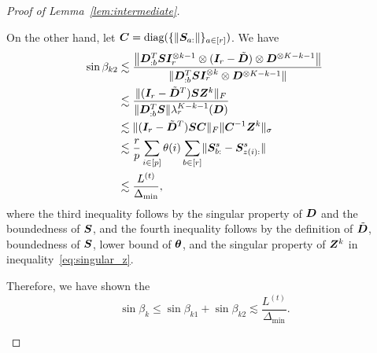 \documentclass[lettersize,journal]{IEEEtran}
\theoremstyle{definition}
\theoremstyle{definition}
\def\fixme#1#2{\textbf{\color{red}[FIXME (#1): #2]}}
\begin{document}
\begin{proof}[Proof of Lemma~\ref{lem:intermediate}]
\begin{enumerate}
    On the other hand, let $\bm C = \text{diag}(\{\lVert\bm S_{a:}\rVert\}_{a \in [r]})$. We have 
    \begin{align}
        \sin \beta_{k2} &\lesssim \frac{ \left\lVert\bm{D}_{:b}^{T} \bm S \bm I_r^{\otimes k-1} \otimes (\bm I_r - \tilde {\bm{D}}) \otimes \bm{D}^{\otimes K-k-1} \right\rVert }{\lVert\bm{D}_{:b}^{T} \bm S \bm I_r^{\otimes k} \otimes \bm{D}^{\otimes K-k-1} \rVert  }\\
        & \lesssim \frac{ \lVert(\bm I_r - \tilde {\bm{D}}^T) \bm S \bm Z^k\rVert_F }{\lVert\bm{D}_{:b}^{T} \bm S\rVert \lambda_r^{K-k-1}(\bm{D})} \\
        & \lesssim \lVert(\bm I_r - \tilde {\bm{D}}^T) \bm S \bm C \rVert_F \lVert\bm C^{-1} \bm Z^k\rVert_{\sigma}\\
        & \lesssim \frac{r}{p} \sum_{i \in [p]} \theta(i) \sum_{b \in [r]} \lVert\bm S_{b:}^s - \bm S_{z(i):}^s\rVert \\
        & \lesssim \frac{L^{(t)}}{\Delta_{\min}}, 
    \end{align}
    where the third inequality follows by the singular property of $\bm{D}$ and the boundedness of $\bm S$, and the fourth inequality follows by the definition of $\tilde {\bm{D}}$, boundedness of $\bm S$, lower bound of $\boldsymbol{\theta}$, and the singular property of $\bm Z^k$ in inequality~\eqref{eq:singular_z}. 
    
    Therefore, we have shown the 
    \begin{equation}
        \sin \beta_k \leq \sin \beta_{k1} + \sin \beta_{k2} \lesssim \frac{L^{(t)}}{\Delta_{\min}}.
    \end{equation}

    
   
    
    

\end{enumerate}
\end{proof}
\end{document}
